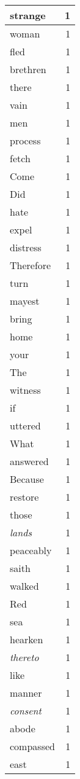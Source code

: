 \begin{center}
\begin{longtable}{l|r}
strange & 1\\ \hline 
woman & 1\\ \hline 
fled & 1\\ \hline 
brethren & 1\\ \hline 
there & 1\\ \hline 
vain & 1\\ \hline 
men & 1\\ \hline 
process & 1\\ \hline 
fetch & 1\\ \hline 
Come & 1\\ \hline 
Did & 1\\ \hline 
hate & 1\\ \hline 
expel & 1\\ \hline 
distress & 1\\ \hline 
Therefore & 1\\ \hline 
turn & 1\\ \hline 
mayest & 1\\ \hline 
bring & 1\\ \hline 
home & 1\\ \hline 
your & 1\\ \hline 
The & 1\\ \hline 
witness & 1\\ \hline 
if & 1\\ \hline 
uttered & 1\\ \hline 
What & 1\\ \hline 
answered & 1\\ \hline 
Because & 1\\ \hline 
restore & 1\\ \hline 
those & 1\\ \hline 
\emph{lands} & 1\\ \hline 
peaceably & 1\\ \hline 
saith & 1\\ \hline 
walked & 1\\ \hline 
Red & 1\\ \hline 
sea & 1\\ \hline 
hearken & 1\\ \hline 
\emph{thereto} & 1\\ \hline 
like & 1\\ \hline 
manner & 1\\ \hline 
\emph{consent} & 1\\ \hline 
abode & 1\\ \hline 
compassed & 1\\ \hline 
east & 1\\ \hline 

\end{longtable}
\end{center}
